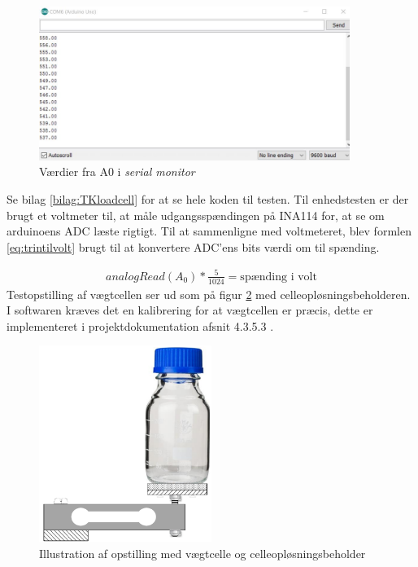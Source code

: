 \begin{figure}[H]
	\centering
	\includegraphics[width=0.9\textwidth]{billeder/Hardware/diagrammer/loadcellunittestbits.JPG}
	\caption{Værdier fra A0 i \textit{serial monitor}}
	\label{fig:loadcell_test}
\end{figure}

 Se bilag \ref{bilag:TKloadcell} for at se hele koden til testen. Til enhedstesten er der brugt et voltmeter til, at måle udgangsspændingen på INA114 for, at se om arduinoens ADC læste rigtigt. Til at sammenligne med voltmeteret, blev formlen \ref{eq:trintilvolt} brugt til at konvertere ADC'ens bits værdi om til spænding.
 
 \begin{align}
 analogRead(A_0)*\frac{5}{1024}=\text{spænding i volt}
 \label{eq:trintilvolt}
 \end{align}
Testopstilling af vægtcellen ser ud som på figur \ref{fig:loadcell_mont} med celleopløsningsbeholderen. I softwaren kræves det en kalibrering for at vægtcellen er præcis, dette er implementeret i projektdokumentation afsnit 4.3.5.3 .
 
 \begin{figure}[H]
	\centering
	\includegraphics[width=0.5\textwidth]{billeder/Hardware/diagrammer/loadcell_montering.pdf}
	\caption{Illustration af opstilling med vægtcelle og celleopløsningsbeholder}
	\label{fig:loadcell_mont}
\end{figure}

